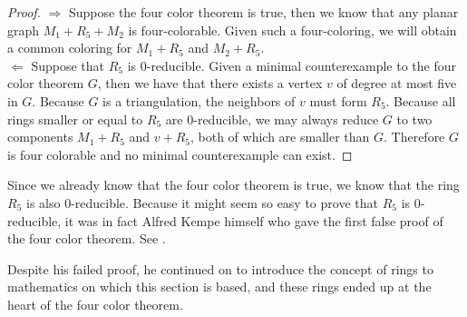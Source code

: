 \begin{proof}
\hfill\newline
$\Longrightarrow$ Suppose the four color theorem is true, then we know that any planar graph $M_1 + R_5 + M_2$ is four-colorable. Given such a four-coloring, we will obtain a common coloring for $M_1+R_5$ and $M_2+R_5$.\\
$\Longleftarrow$ Suppose that $R_5$ is 0-reducible. Given a minimal counterexample to the four color theorem $G$, then we have that there exists a vertex $v$ of degree at most five in $G$. Because $G$ is a triangulation, the neighbors of $v$ must form $R_5$. Because all rings smaller or equal to $R_5$ are 0-reducible, we may always reduce $G$ to two components $M_1+R_5$ and $v+R_5$, both of which are smaller than $G$. Therefore $G$ is four colorable and no minimal counterexample can exist.
\end{proof}

Since we already know that the four color theorem is true, we know that the ring $R_5$ is also 0-reducible. Because it might seem so easy to prove that $R_5$ is 0-reducible, it was in fact Alfred Kempe himself who gave the first false proof of the four color theorem. See \cite{kempe}.

Despite his failed proof, he continued on to introduce the concept of rings to mathematics on which this section is based, and these rings ended up at the heart of the four color theorem.